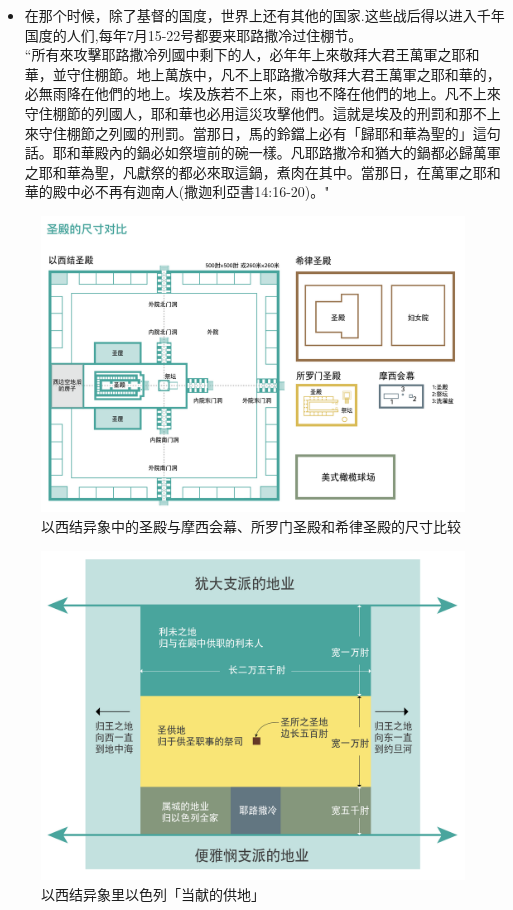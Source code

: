 \begin{itemize}[noitemsep]
\begin{itemize}[noitemsep]
\item 在那个时候，除了基督的国度，世界上还有其他的国家.这些战后得以进入千年国度的人们,每年7月15-22号都要来耶路撒冷过住棚节。\\
“所有來攻擊耶路撒冷列國中剩下的人，必年年上來敬拜大君王萬軍之耶和華，並守住棚節。地上萬族中，凡不上耶路撒冷敬拜大君王萬軍之耶和華的，必無雨降在他們的地上。埃及族若不上來，雨也不降在他們的地上。凡不上來守住棚節的列國人，耶和華也必用這災攻擊他們。這就是埃及的刑罰和那不上來守住棚節之列國的刑罰。當那日，馬的鈴鐺上必有「歸耶和華為聖的」這句話。耶和華殿內的鍋必如祭壇前的碗一樣。凡耶路撒冷和猶大的鍋都必歸萬軍之耶和華為聖，凡獻祭的都必來取這鍋，煮肉在其中。當那日，在萬軍之耶和華的殿中必不再有迦南人(撒迦利亞書14:16-20)。"
\end{itemize} 
\end{itemize}

\begin{figure} 
\centering
\includegraphics[width=5in]{TempleSizesComparison.png}
\caption{以西结异象中的圣殿与摩西会幕、所罗门圣殿和希律圣殿的尺寸比较}
\label{fig:sub1}
\end{figure} 

\begin{figure} 
\centering
\includegraphics[width=5in]{land.png}
\caption{以西结异象里以色列「当献的供地」}
\label{fig:sub2}
\end{figure} 